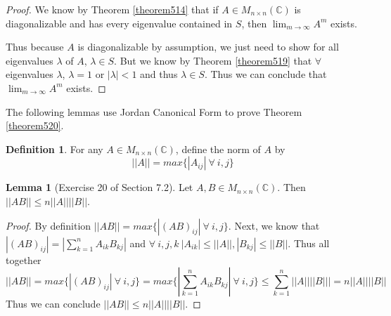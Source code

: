 \documentclass{amsart}
\theoremstyle{definition}
\newtheorem{definition}[thm]{Definition}
\newtheorem{lemma}[theorem]{Lemma}
\theoremstyle{remark}
\numberwithin{equation}{section}
\begin{document}
\begin{proof}

We know by Theorem \ref{theorem514} that if $A \in M_{n \times
n}(\mathbb{C})$ is diagonalizable and has every eigenvalue contained
in $S$, then $\lim_{m \to \infty} A^m$ exists.


Thus because $A$ is diagonalizable by assumption, we just need to show for all eigenvalues $\lambda$ of $A$, $\lambda \in S$.
But we know by Theorem \ref{theorem519} that $\forall$ eigenvalues $\lambda$, $\lambda = 1$ or $|\lambda| < 1$ and thus $\lambda \in S$.
Thus we can conclude that $\lim_{m \to \infty} A^m$ exists.

\end{proof}



The following lemmas use Jordan Canonical Form to prove Theorem
\ref{theorem520}.

\begin{definition}
For any $A \in M_{n \times n}(\mathbb{C})$, define the norm of $A$ by
$$||A|| = max \{|A_{ij}|\ \forall\ i, j \}$$

\end{definition}

\begin{lemma}[Exercise 20 of Section 7.2]\label{exercise7220}
Let $A, B \in M_{n \times n}(\mathbb{C})$.
Then $||AB|| \leq n ||A|| ||B||$.

\end{lemma}


\begin{proof}
    By definition $||AB|| = max \{|(AB)_{ij}|\ \forall\ i, j \}$.
    Next, we know that $|(AB)_{ij}|  = |\sum_{k = 1}^nA_{ik}B_{kj}|$ and
    $\forall\ i, j, k\ |A_{ik}| \leq ||A||,  |B_{kj}| \leq ||B||$.
    Thus all together
    $$ ||AB|| = max \{|(AB)_{ij}|\ \forall\ i, j \} = max \{|\sum_{k = 1}^nA_{ik}B_{kj}|\ \forall\ i, j \} \leq \sum_{k = 1}^n||A||||B||| = n||A||||B||$$
    Thus we can conclude $||AB|| \leq n||A||||B||$.

\end{proof}
\end{document}
